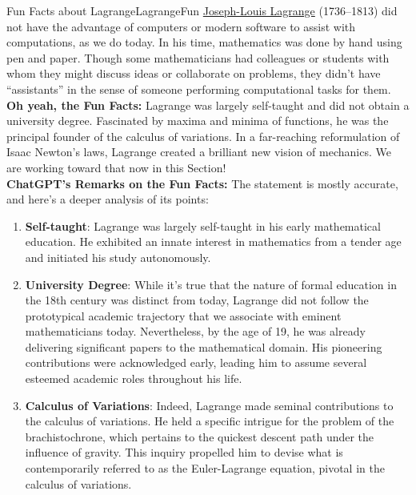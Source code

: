 \begin{funColor}{Fun Facts about Lagrange}{LagrangeFun}
 \href{https://en.wikipedia.org/wiki/Joseph-Louis_Lagrange}{Joseph-Louis Lagrange} (1736–1813) did not have the advantage of computers or modern software to assist with computations, as we do today. In his time, mathematics was done by hand using pen and paper. Though some mathematicians had colleagues or students with whom they might discuss ideas or collaborate on problems, they didn't have ``assistants'' in the sense of someone performing computational tasks for them.\\
 
 \textbf{Oh yeah, the Fun Facts:} Lagrange was largely self-taught and did not obtain a university degree. Fascinated by maxima and minima of functions, he was the principal founder of the calculus of variations. In a far-reaching reformulation of Isaac Newton's laws, Lagrange created a brilliant new vision of mechanics. We are working toward that now in this Section! \\

 \textbf{ChatGPT's Remarks on the Fun Facts: } The statement is mostly accurate, and here's a deeper analysis of its points:

\begin{enumerate}
    \item \textbf{Self-taught}: Lagrange was largely self-taught in his early mathematical education. He exhibited an innate interest in mathematics from a tender age and initiated his study autonomously. 
    
    \item \textbf{University Degree}: While it's true that the nature of formal education in the 18th century was distinct from today, Lagrange did not follow the prototypical academic trajectory that we associate with eminent mathematicians today. Nevertheless, by the age of 19, he was already delivering significant papers to the mathematical domain. His pioneering contributions were acknowledged early, leading him to assume several esteemed academic roles throughout his life.
    
    \item \textbf{Calculus of Variations}: Indeed, Lagrange made seminal contributions to the calculus of variations. He held a specific intrigue for the problem of the brachistochrone, which pertains to the quickest descent path under the influence of gravity. This inquiry propelled him to devise what is contemporarily referred to as the Euler-Lagrange equation, pivotal in the calculus of variations.
    

\end{enumerate}
\end{funColor}
